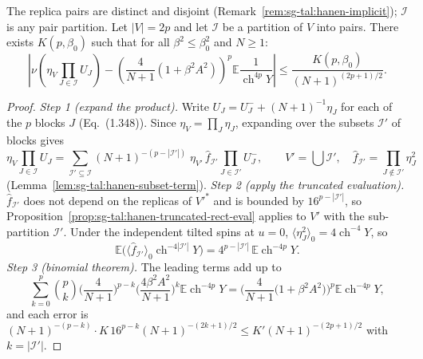 \begin{proposition}\label{prop:sg-tal:hanen-full-rect-eval}
\leanok
{}
The replica pairs are distinct and disjoint (Remark~\ref{rem:sg-tal:hanen-implicit}); $\mathcal I$ is any pair partition.
Let $|V| = 2p$ and let $\mathcal I$ be a partition of $V$ into pairs.
There exists $K(p, \beta_0)$ such that for all $\beta^2 \le \beta_0^2$ and $N \ge 1$:
\[
\left| \nu\left( \eta_V \prod_{J \in \mathcal I} U_J \right) - \left( \frac{4}{N+1} \left( 1 + \beta^2 A^2 \right) \right)^p \mathbb E \frac{1}{\operatorname{ch}^{4p} Y} \right|
\le \frac{K(p, \beta_0)}{(N+1)^{(2p+1)/2}}.
\]
\end{proposition}
\begin{proof}
\leanok
\emph{Step 1 (expand the product).} Write $U_J=U_J^-+(N+1)^{-1}\eta_J$ for each of the $p$ blocks $J$ (Eq.~(1.348)). Since $\eta_V=\prod_J\eta_J$, expanding over the subsets $\mathcal I'$ of blocks gives
\[
\eta_V\prod_{J\in\mathcal I}U_J=\sum_{\mathcal I'\subseteq\mathcal I}(N+1)^{-(p-|\mathcal I'|)}\;\eta_{V'}\,\hat f_{\mathcal I'}\prod_{J\in\mathcal I'}U_J^-,\qquad V'=\bigcup\mathcal I',\quad\hat f_{\mathcal I'}=\prod_{J\notin\mathcal I'}\eta_J^2
\]
(Lemma~\ref{lem:sg-tal:hanen-subset-term}).
\emph{Step 2 (apply the truncated evaluation).} $\hat f_{\mathcal I'}$ does not depend on the replicas of $V'^*$ and is bounded by $16^{p-|\mathcal I'|}$, so Proposition~\ref{prop:sg-tal:hanen-truncated-rect-eval} applies to $V'$ with the sub-partition $\mathcal I'$. Under the independent tilted spins at $u=0$, $\langle\eta_J^2\rangle_0=4\operatorname{ch}^{-4}Y$, so
\[
\mathbb E\big(\langle\hat f_{\mathcal I'}\rangle_0\operatorname{ch}^{-4|\mathcal I'|}Y\big)=4^{p-|\mathcal I'|}\,\mathbb E\operatorname{ch}^{-4p}Y .
\]
\emph{Step 3 (binomial theorem).} The leading terms add up to
\[
\sum_{k=0}^p\binom pk\Big(\frac4{N+1}\Big)^{p-k}\Big(\frac{4\beta^2A^2}{N+1}\Big)^k\mathbb E\operatorname{ch}^{-4p}Y=\Big(\frac4{N+1}\big(1+\beta^2A^2\big)\Big)^p\mathbb E\operatorname{ch}^{-4p}Y,
\]
and each error is $(N+1)^{-(p-k)}\cdot K\,16^{p-k}(N+1)^{-(2k+1)/2}\le K'(N+1)^{-(2p+1)/2}$ with $k=|\mathcal I'|$.
\end{proof}

